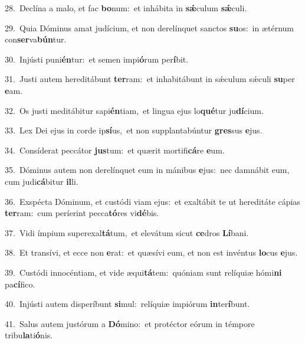 {\numbfont\textcolor{\numbcolor}{28.}}~Declína a malo, et fac \textbf{bo}\-num:~\star et inhábita in \textbf{sǽ}\-culum \textbf{sǽ}\-culi.\par
{\numbfont\textcolor{\numbcolor}{29.}}~Quia Dóminus amat judícium, et non derelínquet sanctos \textbf{su}\-os:~\star in ætérnum con\-\textbf{ser}\-va\-\textbf{bún}\-tur.\par
{\numbfont\textcolor{\numbcolor}{30.}}~Injústi puni\-\textbf{én}\-tur:~\star et semen impi\-\textbf{ó}\-rum per\-\textbf{í}\-bit.\par
{\numbfont\textcolor{\numbcolor}{31.}}~Justi autem hereditábunt \textbf{ter}\-ram:~\star et inhabitábunt in sǽculum sǽculi \textbf{su}\-per \textbf{e}\-am.\par
{\numbfont\textcolor{\numbcolor}{32.}}~Os justi meditábitur sapi\-\textbf{én}\-tiam,~\star et lingua ejus lo\-\textbf{qué}\-tur ju\-\textbf{dí}\-cium.\par
{\numbfont\textcolor{\numbcolor}{33.}}~Lex Dei ejus in corde ip\-\textbf{sí}\-us,~\star et non supplantabúntur \textbf{gres}\-sus \textbf{e}\-jus.\par
{\numbfont\textcolor{\numbcolor}{34.}}~Consíderat peccátor \textbf{jus}\-tum:~\star et quærit mortifi\-\textbf{cá}\-re \textbf{e}\-um.\par
{\numbfont\textcolor{\numbcolor}{35.}}~Dóminus autem non derelínquet eum in mánibus \textbf{e}\-jus:~\star nec damnábit eum, cum judi\-\textbf{cá}\-bitur \textbf{il}\-li.\par
{\numbfont\textcolor{\numbcolor}{36.}}~Exspécta Dóminum, et custódi viam ejus:~\dagger et exaltábit te ut hereditáte cápias \textbf{ter}\-ram:~\star cum períerint pecca\-\textbf{tó}\-res vi\-\textbf{dé}\-bis.\par
{\numbfont\textcolor{\numbcolor}{37.}}~Vidi ímpium superexal\-\textbf{tá}\-tum,~\star et elevátum sicut \textbf{ce}\-dros \textbf{Lí}\-bani.\par
{\numbfont\textcolor{\numbcolor}{38.}}~Et transívi, et ecce non \textbf{e}\-rat:~\star et quæsívi eum, et non est invéntus \textbf{lo}\-cus \textbf{e}\-jus.\par
{\numbfont\textcolor{\numbcolor}{39.}}~Custódi innocéntiam, et vide æqui\-\textbf{tá}\-tem:~\star quóniam sunt relíquiæ hómi\textbf{ni} pa\-\textbf{cí}\-fico.\par
{\numbfont\textcolor{\numbcolor}{40.}}~Injústi autem disperíbunt \textbf{si}\-mul:~\star relíquiæ impiórum \textbf{in}\-ter\-\textbf{í}\-bunt.\par
{\numbfont\textcolor{\numbcolor}{41.}}~Salus autem justórum a \textbf{Dó}\-mino:~\star et protéctor eórum in témpore tribu\-\textbf{la}\-ti\-\textbf{ó}\-nis.\par
